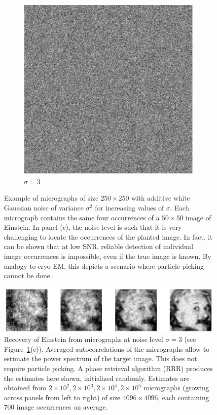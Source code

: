 \documentclass[12pt]{article}
\newcommand{\1}{\mathbf{1}}
\theoremstyle{plain}
\theoremstyle{definition}
\theoremstyle{remark}
\theoremstyle{plain}
\theoremstyle{remark}
\theoremstyle{plain}
\theoremstyle{plain}
\theoremstyle{plain}
\numberwithin{equation}{section}
\begin{document}
\begin{figure}[t]
\begin{subfigure}[h]{0.33\linewidth}
		\centering
		\includegraphics[width=.8\linewidth]{micrograph_Einstein_example_s3}
		\caption{$\sigma = 3$}
	\end{subfigure}
	\caption{\label{fig:micro_example} Example of micrographs of size $250\times 250$ with additive white Gaussian noise of variance $\sigma^2$ for increasing values of $\sigma$. Each micrograph contains the same four occurrences of a $50 \times 50$ image of Einstein. In panel (c), the noise level is such that it is very challenging to locate the occurrences of the planted image. In fact, it can be shown that at low SNR, reliable detection of individual image occurrences is impossible, even if the true image is known. By analogy to cryo-EM, this depicts a scenario where particle picking cannot be done.}
\end{figure}


\begin{figure}[t]
	\centering
	\includegraphics[width=1\linewidth]{Einstien_progress_examples}
	\caption{\label{fig:Einst_example} Recovery of Einstein from micrographs at noise level $\sigma = 3$ (see Figure~\ref{fig:micro_example}(c)). Averaged autocorrelations of the micrographs allow to estimate the power spectrum of the target image. This does not require particle picking. A phase retrieval algorithm (RRR) produces the estimates here shown, initialized randomly. Estimates are obtained from $2\times 10^2,2\times 10^3,2\times 10^4,2\times 10^5$ micrographs (growing across panels from left to right) of size $4096\times 4096$, each containing $700$ image occurrences on average.}	
\end{figure}
\end{document}

